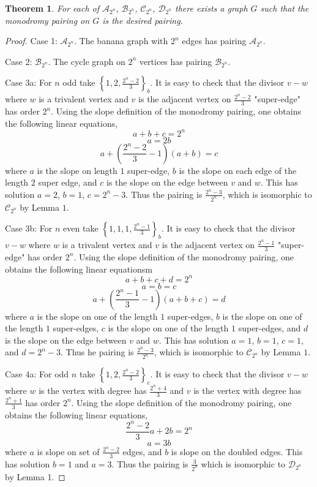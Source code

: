 \documentclass{amsart}
\newtheorem{thm}{Theorem}
\theoremstyle{definition}
\newcommand{\AP}{\ensuremath{\mathcal{A}_{2^{n}}}}
\newcommand{\BP}{\ensuremath{\mathcal{B}_{2^{n}}}}
\newcommand{\CP}{\ensuremath{\mathcal{C}_{2^{n}}}}
\newcommand{\DP}{\ensuremath{\mathcal{D}_{2^{n}}}}
\newcommand{\1}{\ensuremath{\mathds{1}}}
\begin{document}
 \begin{thm}
  For each of $\AP$, $\BP$, $\CP$, $\DP$ there exists a graph $G$ such that the monodromy pairing on $G$ is the desired pairing.
 \end{thm}
 \begin{proof}
  
   Case 1: $\AP$. The banana graph with $2^{n}$ edges has pairing $\AP$.
  
   Case 2: $\BP$. The cycle graph on $2^{n}$ vertices has pairing $\BP$.
  
   Case 3a: For $n$ odd take $\left\{1, 2, \frac{2^{n}-2}{3}\right\}_{b}$. It is easy to check that the divisor $v-w$ where $w$ is a trivalent vertex and $v$ is the adjacent vertex on $\frac{2^{n}-2}{3}$ "super-edge" has order $2^{n}$. Using the slope definition of the monodromy pairing, one obtains the following linear equations,
    \[
     a+b+c=2^{n}
    \]
    \[
    a=2b
    \]
    \[
    a+\left(\frac{2^{n}-2}{3}-1\right)(a+b)=c
    \]
    where $a$ is the slope on length $1$ super-edge, $b$ is the slope on each edge of the length $2$ super edge, and $c$ is the slope on the edge between $v$ and $w$. This has solution $a=2$, $b=1$, $c=2^{n}-3$. Thus the pairing is $\frac{2^{n}-3}{2^{n}}$, which is isomorphic to $\CP$ by Lemma $1$.
    
    Case 3b: For $n$ even take $\left\{1,1,1, \frac{2^{n}-1}{3}\right\}_{b}$. It is easy to check that the divisor $v-w$ where $w$ is a trivalent vertex and $v$ is the adjacent vertex on $\frac{2^{n}-1}{3}$ "super-edge" has order $2^{n}$. Using the slope definition of the monodromy pairing, one obtains the following linear equationsm
     \[
      a+b+c+d=2^{n}
     \]
     \[
      a=b=c
     \]
     \[
      a+\left(\frac{2^{n}-1}{3}-1 \right)(a+b+c)=d
     \]
    where $a$ is the slope on one of the length $1$ super-edges, $b$ is the slope on one of the length $1$ super-edges, $c$ is the slope on one of the length $1$ super-edges, and $d$ is the slope on the edge between $v$ and $w$. This has solution $a=1$, $b=1$, $c=1$, and $d=2^{n}-3$. Thus he pairing is $\frac{2^{n}-3}{2^{n}}$, which is isomorphic to $\CP$ by Lemma $1$.
    
    Case 4a: For odd $n$ take  $\left\{1, 2, \frac{2^{n}-2}{3}\right\}_{c}$. It is easy to check that the divisor $v-w$ where $w$ is the vertex with degree has $\frac{2^{n}+4}{3}$ and $v$ is the vertex with degree has $\frac{2^{n}+1}{3}$ has order $2^{n}$. Using the slope definition of the monodromy pairing, one obtains the following linear equations,
     \[
      \frac{2^{n}-2}{3}a+2b=2^{n}
     \]
     \[
      a=3b
     \]
    where $a$ is slope on set of $\frac{2^{n}-2}{3}$ edges, and $b$ is slope on the doubled edges. This has solution $b=1$ and $a=3$. Thus the pairing is $\frac{3}{2^{n}}$ which is isomorphic to $\DP$ by Lemma 1.
    

\end{proof}
\end{document}
